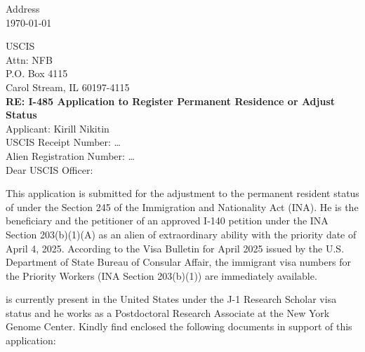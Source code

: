 
\begin{flushright}
	Address\\
	\smallskip
	\today
\end{flushright}

USCIS\\
Attn: NFB\\
P.O. Box 4115\\
Carol Stream, IL 60197-4115\\

\textbf{RE: I-485 Application to Register Permanent Residence or Adjust Status}\smallskip\\
Applicant: Kirill Nikitin\\
USCIS Receipt Number: \ldots\\
Alien Registration Number: \ldots\\

Dear USCIS Officer:

This application is submitted for the adjustment to the permanent resident
status of \drfull under the Section 245 of the Immigration and Nationality Act
(INA).
He is the beneficiary and the petitioner of an approved I-140 petition under
the INA Section 203(b)(1)(A) as an alien of extraordinary ability with the
priority date of April 4, 2025. 
According to the Visa Bulletin for April 2025 issued by the U.S. Department of
State Bureau of Consular Affair, the immigrant visa numbers for the Priority
Workers (INA Section 203(b)(1)) are immediately available.

\dr is currently present in the United States under the J-1 Research Scholar
visa status and he works as a Postdoctoral Research Associate at the New York
Genome Center.
Kindly find enclosed the following documents in support of this application:

